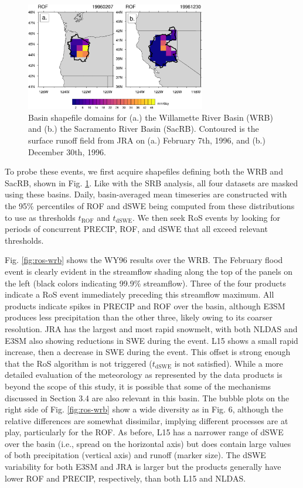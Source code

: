 \documentclass{article}
\begin{document}
\begin{figure}[H]
\noindent\includegraphics[width=0.7\textwidth]{figs/cropped/other_basins_ROF.pdf}
\caption{Basin shapefile domains for (a.) the Willamette River Basin (WRB) and (b.) the Sacramento River Basin (SacRB). Contoured is the surface runoff field from JRA on (a.) February 7th, 1996, and (b.) December 30th, 1996.}
\label{fig:otherbasins}
\end{figure}

To probe these events, we first acquire shapefiles defining both the WRB and SacRB, shown in Fig. \ref{fig:otherbasins}.
Like with the SRB analysis, all four datasets are masked using these basins.
Daily, basin-averaged mean timeseries are constructed with the 95\% percentiles of ROF and dSWE being computed from these distributions to use as thresholds $t_{\textrm{ROF}}$ and $t_{\textrm{dSWE}}$.
We then seek RoS events by looking for periods of concurrent PRECIP, ROF, and dSWE that all exceed relevant thresholds.

Fig. \ref{fig:ros-wrb} shows the WY96 results over the WRB. The February flood event is clearly evident in the streamflow shading along the top of the panels on the left (black colors indicating 99.9\% streamflow).
Three of the four products indicate a RoS event immediately preceding this streamflow maximum.
All products indicate spikes in PRECIP and ROF over the basin, although E3SM produces less precipitation than the other three, likely owing to its coarser resolution.
JRA has the largest and most rapid snowmelt, with both NLDAS and E3SM also showing reductions in SWE during the event.
L15 shows a small rapid increase, then a decrease in SWE during the event.
This offset is strong enough that the RoS algorithm is not triggered ($t_{\textrm{dSWE}}$ is not satisfied).
While a more detailed evaluation of the meteorology as represented by the data products is beyond the scope of this study, it is possible that some of the mechanisms discussed in Section 3.4 are also relevant in this basin.
The bubble plots on the right side of Fig. \ref{fig:ros-wrb} show a wide diversity as in Fig. 6, although the relative differences are somewhat dissimilar, implying different processes are at play, particularly for the ROF.
As before, L15 has a narrower range of dSWE over the basin (i.e., spread on the horizontal axis) but does contain large values of both precipitation (vertical axis) and runoff (marker size).
The dSWE variability for both E3SM and JRA is larger but the products generally have lower ROF and PRECIP, respectively, than both L15 and NLDAS.
\end{document}
